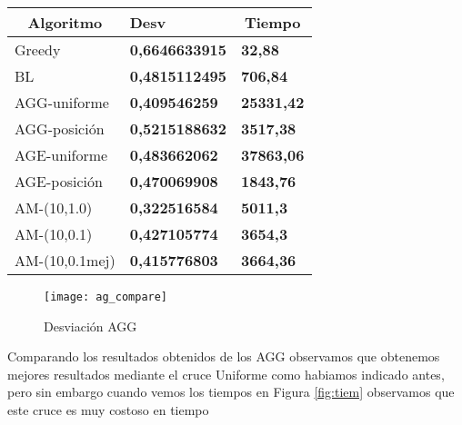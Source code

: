 \begin{table}[H]
  \begin{tabular}{|l|l|l|}
  \hline
  \multicolumn{1}{|c|}{Algoritmo}   & \multicolumn{1}{l|}{Desv}                  & \multicolumn{1}{c|}{Tiempo}           \\ \hline
  Greedy                            & \textbf{0,6646633915}                      & \textbf{32,88}                        \\\hline
  BL                                & \textbf{0,4815112495}                      & \textbf{706,84}                       \\\hline
  AGG-uniforme                      & \textbf{0,409546259}                       & \textbf{25331,42}  \\\hline
  AGG-posición                      & \textbf{0,5215188632}                      & \textbf{3517,38}                      \\\hline
  AGE-uniforme                      & \textbf{0,483662062  }                      & \textbf{37863,06}                                             \\\hline
  AGE-posición                      & \textbf{0,470069908 }                      & \textbf{1843,76}                                               \\\hline
  AM-(10,1.0)                       & \textbf{0,322516584  }                      & \textbf{5011,3 }                     \\ \hline
  AM-(10,0.1)                       & \textbf{0,427105774  }                      & \textbf{3654,3  }                       \\ \hline
  AM-(10,0.1mej)                    & \textbf{0,415776803  }                      & \textbf{3664,36  }                      \\ \hline
  \end{tabular}
  \end{table}


\begin{figure}[h]
  \centering
  \texttt{[image: ag\_compare]}
  \caption{Desviación AGG}
  \label{gra2}
\end{figure}

Comparando los resultados obtenidos de los AGG observamos que obtenemos mejores resultados mediante el cruce Uniforme como habiamos indicado
antes, pero sin embargo cuando vemos los tiempos en Figura \ref{fig:tiem} observamos que este cruce es muy costoso en tiempo



